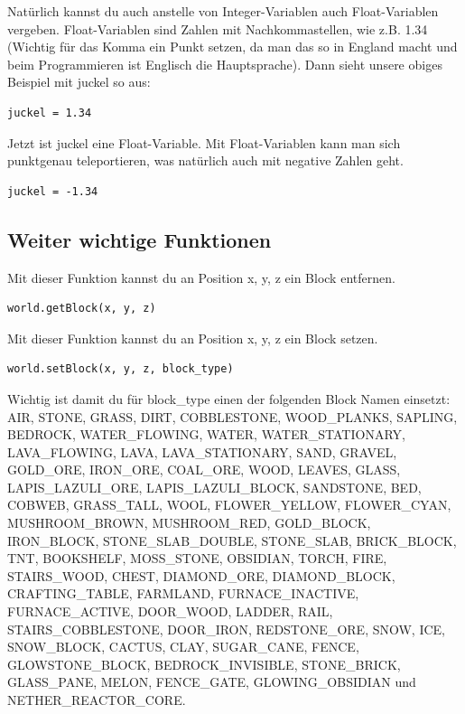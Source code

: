 Natürlich kannst du auch anstelle von Integer-Variablen auch Float-Variablen vergeben. Float-Variablen sind Zahlen mit Nachkommastellen, wie z.B. 1.34 (Wichtig für das Komma ein Punkt setzen, da man das so in England macht und beim Programmieren ist Englisch die Hauptsprache). Dann sieht unsere obiges Beispiel mit juckel so aus:
\lstset{language=Python}
\lstset{frame=lines}
\lstset{basicstyle=\footnotesize}
\begin{lstlisting}
juckel = 1.34
\end{lstlisting}
Jetzt ist juckel eine Float-Variable. Mit Float-Variablen kann man sich punktgenau teleportieren, was natürlich auch mit negative Zahlen geht. 
\lstset{language=Python}
\lstset{frame=lines}
\lstset{basicstyle=\footnotesize}
\begin{lstlisting}
juckel = -1.34
\end{lstlisting}

\subsection{Weiter wichtige Funktionen}


Mit dieser Funktion kannst du an Position x, y, z ein Block entfernen.
\lstset{language=Python}
\lstset{frame=lines}
\lstset{basicstyle=\footnotesize}
\begin{lstlisting}
world.getBlock(x, y, z)
\end{lstlisting}

Mit dieser Funktion kannst du an Position x, y, z ein Block setzen.
\lstset{language=Python}
\lstset{frame=lines}
\lstset{basicstyle=\footnotesize}
\begin{lstlisting}
world.setBlock(x, y, z, block_type)
\end{lstlisting}

 Wichtig ist damit du für block\_type einen der folgenden Block Namen einsetzt:
 AIR, STONE, GRASS, DIRT, COBBLESTONE, WOOD\_PLANKS, SAPLING, BEDROCK, WATER\_FLOWING, WATER, WATER\_STATIONARY, LAVA\_FLOWING, LAVA, LAVA\_STATIONARY, SAND, GRAVEL, GOLD\_ORE, IRON\_ORE, COAL\_ORE, WOOD, LEAVES, GLASS, LAPIS\_LAZULI\_ORE, LAPIS\_LAZULI\_BLOCK, SANDSTONE, BED, COBWEB, GRASS\_TALL, WOOL, FLOWER\_YELLOW, FLOWER\_CYAN, MUSHROOM\_BROWN, MUSHROOM\_RED, GOLD\_BLOCK, IRON\_BLOCK, STONE\_SLAB\_DOUBLE, STONE\_SLAB, BRICK\_BLOCK, TNT, BOOKSHELF, MOSS\_STONE, OBSIDIAN, TORCH, FIRE, STAIRS\_WOOD, CHEST, DIAMOND\_ORE, DIAMOND\_BLOCK, CRAFTING\_TABLE, FARMLAND, FURNACE\_INACTIVE, FURNACE\_ACTIVE, DOOR\_WOOD, LADDER, RAIL, STAIRS\_COBBLESTONE, DOOR\_IRON, REDSTONE\_ORE, SNOW, ICE, SNOW\_BLOCK, CACTUS, CLAY, SUGAR\_CANE, FENCE, GLOWSTONE\_BLOCK, BEDROCK\_INVISIBLE, STONE\_BRICK, GLASS\_PANE, MELON, FENCE\_GATE, GLOWING\_OBSIDIAN und NETHER\_REACTOR\_CORE.
 
